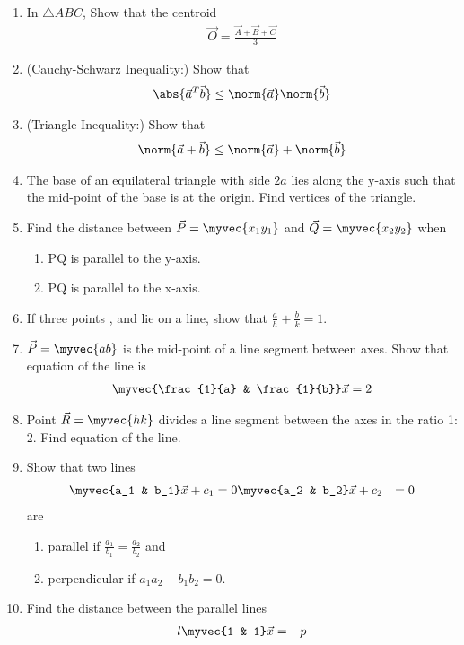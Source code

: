 \begin{enumerate}[label=\arabic*.,ref=\thesubsection.\theenumi]
\item In $\triangle ABC$, Show that the centroid 
\begin{align}
\vec{O} = \frac{\vec{A}+\vec{B}+\vec{C}}{3}
\end{align}
%
\item (Cauchy-Schwarz Inequality:) Show that 
%
\begin{align}
\abs{\vec{a}^T\vec{b}} \le \norm{\vec{a}}\norm{\vec{b}}
\end{align}
%
%
\item (Triangle Inequality:) Show that 
%
\begin{align}
\norm{\vec{a}+\vec{b}} \le \norm{\vec{a}}+\norm{\vec{b}}
\end{align}
%
%
\item The base of an equilateral triangle with side $2a$ lies along the y-axis such that the mid-point of the base is at the origin. Find vertices of the triangle.
\item Find the distance between $\vec{P}= \myvec{x_1 y_1}$ and $\vec{Q} =\myvec{x_2 y_2}$ when
\begin{enumerate}
\item PQ is parallel to the y-axis.
\item PQ is parallel to the x-axis.
\end{enumerate}
\item If three points ,  and  lie on a line, show that
$\frac{a}{h}+\frac{b}{k}= 1$.
\item $\vec{P}=\myvec{a b}$ is the mid-point of a line segment between axes. Show that equation of the line is
\begin{align}
\myvec{\frac{1}{a} & \frac{1}{b}}\vec{x} = 2
\end{align}
\item  Point $\vec{R}= \myvec{h k}$ divides a line segment between the axes in the ratio 1: 2. Find equation of the line.
\item Show that two lines 
\begin{align}
\myvec{a_1 & b_1}\vec{x} +c_1&= 0

\myvec{a_2 & b_2}\vec{x} +c_2&= 0
\end{align}
are 
\begin{enumerate}
\item parallel if $\frac{a_1}{b_1}=\frac{a_2}{b_2}$ and
\item perpendicular if $a_1a_2-b_1b_2 = 0$.
\end{enumerate}
%
\item Find the distance between the parallel lines
%
\begin{align}
l\myvec{1 & 1}\vec{x} = -p


\end{align}
\end{enumerate}
